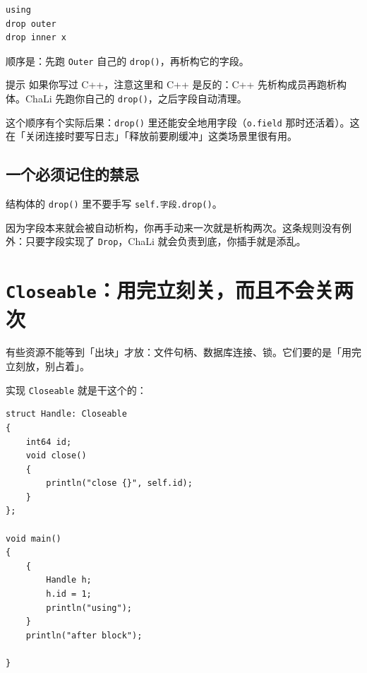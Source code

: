 \par
\medskip
\begin{lstlisting}[style=out]
using
drop outer
drop inner x
\end{lstlisting}
\par
\medskip

顺序是：先跑 \texttt{Outer} 自己的 \texttt{drop(\allowbreak{})\allowbreak{}}，再析构它的字段。

\begin{tip}{提示}
如果你写过 C++，注意这里和 C++ 是反的：C++ 先析构成员再跑析构体。ChaLi 先跑你自己的 \texttt{drop(\allowbreak{})\allowbreak{}}，之后字段自动清理。\par 这个顺序有个实际后果：\texttt{drop(\allowbreak{})\allowbreak{}} 里还能安全地用字段（\texttt{o.\allowbreak{}field} 那时还活着）。这在「关闭连接时要写日志」「释放前要刷缓冲」这类场景里很有用。
\end{tip}

\subsection*{一个必须记住的禁忌}

结构体的 \texttt{drop(\allowbreak{})\allowbreak{}} 里不要手写 \texttt{self.\allowbreak{}字段.\allowbreak{}drop(\allowbreak{})\allowbreak{}}。

因为字段本来就会被自动析构，你再手动来一次就是析构两次。这条规则没有例外：只要字段实现了 \texttt{Drop}，ChaLi 就会负责到底，你插手就是添乱。

\section{\texttt{Closeable}：用完立刻关，而且不会关两次}

有些资源不能等到「出块」才放：文件句柄、数据库连接、锁。它们要的是「用完立刻放，别占着」。

实现 \texttt{Closeable} 就是干这个的：

\par
\medskip
\begin{lstlisting}[style=chali]
struct Handle: Closeable
{
    int64 id;
    void close()
    {
        println("close {}", self.id);
    }
};

void main()
{
    {
        Handle h;
        h.id = 1;
        println("using");
    }
    println("after block");

}
\end{lstlisting}
\par
\medskip

